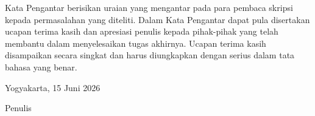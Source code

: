 Kata Pengantar berisikan uraian yang mengantar pada para pembaca skripsi kepada
permasalahan yang diteliti. Dalam Kata Pengantar dapat pula disertakan ucapan terima kasih
dan apresiasi penulis kepada pihak-pihak yang telah membantu dalam menyelesaikan tugas
akhirnya. Ucapan terima kasih disampaikan secara singkat dan harus diungkapkan dengan
serius dalam tata bahasa yang benar.   
\newline

\begin{flushright}
Yogyakarta, 15 Juni 2026
\end{flushright}
\vspace{0.5cm}
\begin{flushright}
Penulis
\end{flushright}